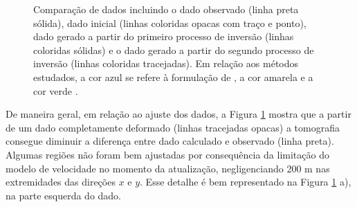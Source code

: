 \begin{figure}[H]
	\centering
	
	\caption{Comparação de dados incluindo o dado observado (linha preta sólida), dado inicial (linhas coloridas opacas com traço e ponto), dado gerado a partir do primeiro processo de inversão (linhas coloridas sólidas) e o dado gerado a partir do segundo processo de inversão (linhas coloridas tracejadas). Em relação aos métodos estudados, a cor azul se refere à formulação de , a cor amarela  e a cor verde .}
	\label{fig:zoom_out}
\end{figure}

De maneira geral, em relação ao ajuste dos dados, a Figura \ref{fig:zoom_out} mostra que a partir de um dado completamente deformado (linhas tracejadas opacas) a tomografia consegue diminuir a diferença entre dado calculado e observado (linha preta). Algumas regiões não foram bem ajustadas por consequência da limitação do modelo de velocidade no momento da atualização, negligenciando 200 m nas extremidades das direções $x$ e $y$. Esse detalhe é bem representado na Figura \ref{fig:zoom_out} a), na parte esquerda do dado.  

